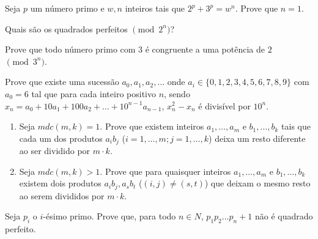 \begin{questao}
  Seja $p$ um número primo e $w,n$ inteiros tais que
  $2^p+3^p=w^n$. Prove que $n=1$.

\end{questao}

\begin{questao}
  Quais são os quadrados perfeitos $\pmod{2^n}$?

\end{questao}

\begin{questao}
  Prove que todo número primo com $3$ é congruente a uma
  potência de $2$ $\pmod{3^n}$.

\end{questao}

\begin{questao}
  Prove que existe uma sucessão $a_0,a_1,a_2,\ldots$ onde
  $a_i\in\{0,1,2,3,4,5,6,7,8,9\}$ com $a_0 = 6$ tal que para cada
  inteiro positivo $n$, sendo
  $x_n=a_0+10a_1+100a_2+\ldots+10^{n-1}a_{n-1}$, $x_n^2-x_n$ é
  divisível por $10^n$.
\end{questao}

\begin{questao}
  \begin{enumerate}

    \item Seja $mdc(m,k) = 1$. Prove que existem inteiros
    $a_1,\ldots,a_m$ e $b_1,\ldots,b_k$ tais que cada um dos
    produtos $a_ib_j$ ($i=1,\ldots,m;j=1,\ldots,k$) deixa um resto
    diferente ao ser dividido por $m \cdot k$.

    \item Seja $mdc(m,k) > 1$. Prove que para quaisquer inteiros
    $a_1,\ldots,a_m$ e $b_1,\ldots,b_k$ existem dois produtos
    $a_ib_j,a_sb_t$ ($(i,j) \not = (s,t)$) que deixam o mesmo resto
    ao serem divididos por $m \cdot k$.
  \end{enumerate}
\end{questao}

\begin{questao}
  Seja $p_i$ o $i$-ésimo primo. Prove que, para todo $n \in N$,
  $p_1p_2\ldots p_n+1$ não é quadrado perfeito.
\end{questao}

